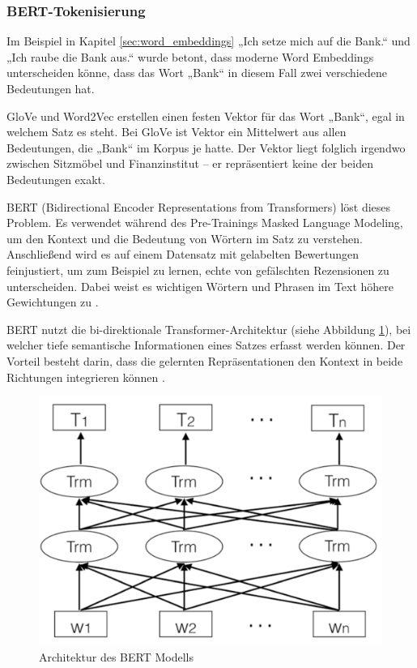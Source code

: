\subsubsection{BERT-Tokenisierung}

Im Beispiel in Kapitel \ref{sec:word_embeddings} „Ich setze mich auf die Bank.“ und „Ich raube die Bank aus.“ wurde betont, dass moderne
Word Embeddings unterscheiden könne, dass das Wort „Bank“ in diesem Fall zwei verschiedene Bedeutungen hat.

GloVe und Word2Vec erstellen einen festen Vektor für das Wort „Bank“, egal in welchem Satz es steht.
Bei GloVe ist Vektor ein Mittelwert aus allen Bedeutungen, die „Bank“ im Korpus je hatte.
Der Vektor liegt folglich irgendwo zwischen Sitzmöbel und Finanzinstitut – er repräsentiert keine der beiden Bedeutungen exakt.

BERT (Bidirectional Encoder Representations from Transformers) löst dieses Problem. 
Es verwendet während des Pre-Trainings Masked Language Modeling, um den Kontext und die Bedeutung von Wörtern im Satz zu verstehen.
Anschließend wird es auf einem Datensatz mit gelabelten Bewertungen feinjustiert, um zum Beispiel zu lernen, echte von gefälschten 
Rezensionen zu unterscheiden. Dabei weist es wichtigen Wörtern und Phrasen im Text höhere Gewichtungen zu \cite{Deshai:2023aa}.

BERT nutzt die bi-direktionale Transformer-Architektur (siehe Abbildung \ref{fig:architecture_bert}), bei welcher tiefe semantische Informationen 
eines Satzes erfasst werden können.
Der Vorteil besteht darin, dass die gelernten Repräsentationen den Kontext in beide Richtungen integrieren können \cite{Wang:2020aa}.

\begin{figure}[htbp]
    \begin{center}
        \includegraphics[scale=0.3]{static/architecture_bert.png}
        \caption{\label{fig:architecture_bert} Architektur des BERT Modells \cite{Wang:2020aa}}
    \end{center}
\end{figure}

